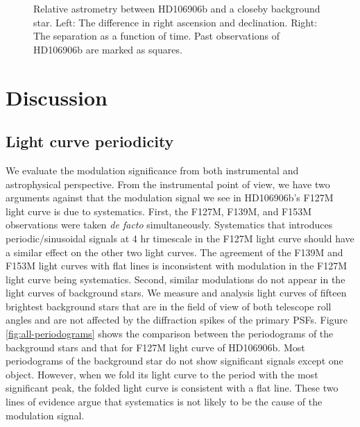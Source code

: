 \documentclass[twocolumn]{aastex62}
\begin{document}
\begin{figure}
  \centering
  \caption{Relative astrometry between HD106906b and a closeby background star. Left: The difference in right ascension and declination. Right: The separation as a function of time. Past observations of HD106906b are marked as squares.}
  \label{fig:astrometry:bck}
\end{figure}






\section{Discussion}
\subsection{Light curve periodicity}

We evaluate the modulation significance from both instrumental and astrophysical perspective. From the instrumental point of view, we have two arguments against that the modulation signal we see in HD106906b's F127M light curve is due to systematics. First, the F127M, F139M, and F153M observations were taken \emph{de facto} simultaneously. Systematics that introduces periodic/sinusoidal signals at 4 hr timescale in the F127M light curve should have a similar effect on the other two light curves. The agreement of the  F139M and F153M light curves with flat lines is inconsistent with modulation in the F127M light curve being systematics. Second, similar modulations do not appear in the light curves of background stars. We measure and analysis light curves of fifteen brightest background stars that are in the field of view of both telescope roll angles and are not affected by the diffraction spikes of the primary PSFs.
Figure \ref{fig:all-periodograms} shows the comparison between the periodograms of the background stars and that for F127M light curve of HD106906b. Most periodograms of the background star do not show significant signals except one object. However, when we fold its light curve to the period with the most significant peak, the folded light curve is consistent with a flat line. These two lines of evidence argue that systematics is not likely to be the cause of the modulation signal.
\end{document}
